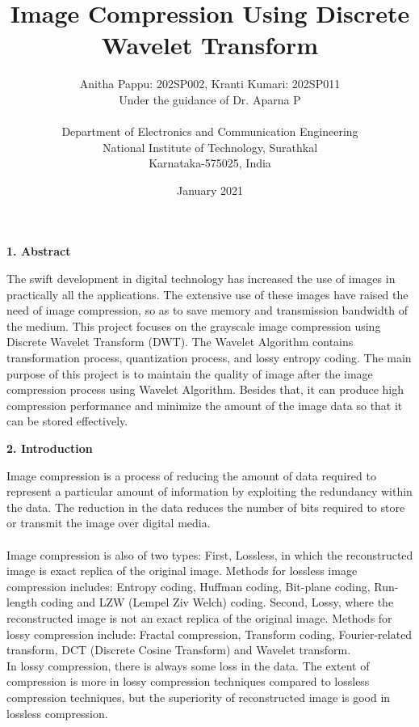 \documentclass{article}
\title{\textbf{\Huge Image Compression Using Discrete Wavelet Transform}}
\author{\Large Anitha Pappu: 202SP002, Kranti Kumari: 202SP011 \\ Under the guidance of Dr. Aparna P\\\\ Department of Electronics and Communication Engineering\\ National Institute of Technology, Surathkal\\  Karnataka-575025, India}
\date{January 2021}
\begin{document}
\maketitle

\begin{flushleft}
\textbf{\large 1. Abstract}
\end{flushleft}

The swift development in digital technology has increased the use of images in practically all the applications. The extensive use of these images have raised the need of image compression, so as to save memory and transmission bandwidth 
of the medium. This project focuses on the grayscale image compression using Discrete Wavelet Transform (DWT). The Wavelet Algorithm contains transformation process, quantization process, and lossy entropy coding. The main purpose of this project is to maintain the quality of image after the image compression process using Wavelet Algorithm. Besides that, it can produce high compression performance and minimize the amount of the image data so that it can be stored effectively.\\

\begin{flushleft}
\textbf{\large 2. Introduction}
\end{flushleft}

Image compression is a process of reducing the amount of data required to represent a particular amount of information by exploiting the redundancy within the data. The reduction in the data reduces the number of bits required to store or transmit the image over digital media.\\\\
Image compression is also of two types: First, Lossless, in which the reconstructed image is exact replica of the original image. Methods for lossless image compression includes: Entropy coding, Huffman coding, Bit-plane coding, Run-length coding and LZW (Lempel Ziv Welch) coding. Second, Lossy, where the reconstructed image is not an exact replica of the original image. Methods for lossy compression include: Fractal compression, Transform coding, Fourier-related transform, DCT (Discrete Cosine Transform) and Wavelet transform.\\
In lossy compression, there is always some loss in the data. The extent of compression is more in lossy compression techniques compared to lossless compression techniques, but the superiority of reconstructed image is good in lossless compression.\\\\
\end{document}
